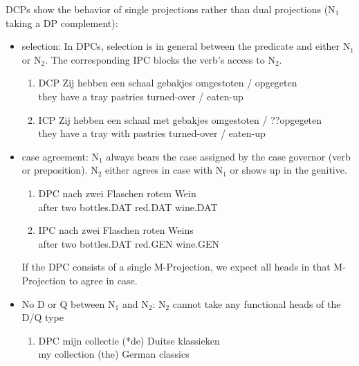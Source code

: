 \documentclass{article}
\begin{document}
DCPs show the behavior of single projections rather than dual projections (N$_{1}$ taking a DP complement):
\begin{itemize}
\item selection: In DPCs, selection is in general between the predicate and either N$_{1}$ or N$_{2}$. The corresponding IPC blocks the verb's access to N$_{2}$. 
\begin{example}
\label{}
\begin{enumerate}
\item DCP  
 \gll  Zij hebben een schaal gebakjes omgestoten / opgegeten\\
they have a tray pastries turned-over / eaten-up\\

   \glt
   \glend
\item ICP
 \gll Zij hebben een schaal met gebakjes omgestoten / ??opgegeten\\
they have a tray with pastries turned-over / eaten-up\\

   \glt
   \glend
\end{enumerate}
   \end{example}

\item case agreement: N$_{1}$ always bears the case assigned by the case governor (verb or preposition). N$_{2}$ either agrees in case with N$_{1}$ or shows up in the genitive.

\begin{example}
\label{German Case}
\begin{enumerate}
\item DPC
   \gll nach zwei Flaschen rotem Wein\\
after two bottles.DAT red.DAT wine.DAT\\

\item IPC
\gll nach zwei Flaschen roten Weins\\
after two bottles.DAT red.GEN wine.GEN\\
   \glt
   \glend
\end{enumerate}
   \end{example}
If the DPC consists of a single M-Projection, we expect all heads in that M-Projection to agree in case.

\item No D or Q between N$_{1}$ and N$_{2}$:
N$_{2}$ cannot take any functional heads of the D/Q type

\begin{example}
\label{Dutch head}
\begin{enumerate}
\item DPC
   \gll mijn collectie (*de) Duitse klassieken\\
my collection (the) German classics\\


\end{enumerate}
\end{example}
\end{itemize}
\end{document}
